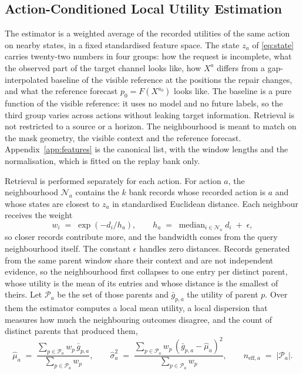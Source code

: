 \documentclass{article}
\newcommand{\calN}{\mathcal{N}}
\newcommand{\calP}{\mathcal{P}}
\begin{document}
\subsection{Action-Conditioned Local Utility Estimation}
\label{sec:method-scoring}
The estimator is a weighted average of the recorded utilities of the same action on nearby
states, in a fixed standardised feature space. The state $z_a$ of \eqref{eq:state} carries
twenty-two numbers in four groups: how the request is incomplete, what the observed part of the
target channel looks like, how $X^{a}$ differs from a gap-interpolated baseline of the visible
reference at the positions the repair changes, and what the reference forecast
$p_0 = F(X^{a_0})$ looks like. The baseline is a pure function of the visible reference: it
uses no model and no future labels, so the third group varies across actions without leaking
target information. Retrieval is not
restricted to a source or a horizon. The neighbourhood is meant to match on the mask geometry,
the visible context and the reference forecast. Appendix~\ref{app:features} is the canonical
list, with the window lengths and the normalisation, which is fitted on the replay bank only.

Retrieval is performed separately for each action. For action $a$, the neighbourhood
$\calN_a$ contains the $k$ bank records whose recorded action is $a$ and whose states are
closest to $z_a$ in standardised Euclidean distance. Each neighbour receives the weight
\begin{equation}
  w_i \;=\; \exp\!\left(-d_i / h_a\right),
  \qquad
  h_a \;=\; \operatorname{median}_{i \in \calN_a} d_i \;+\; \epsilon ,
  \label{eq:weights}
\end{equation}
so closer records contribute more, and the bandwidth comes from the query neighbourhood
itself. The constant $\epsilon$ handles zero distances. Records generated from the same
parent window share their context and are not independent evidence, so the neighbourhood
first collapses to one entry per distinct parent, whose utility is the mean of its entries and
whose distance is the smallest of theirs. Let $\calP_a$ be the set of those parents and
$\bar g_{p,a}$ the utility of parent $p$. Over them the estimator computes a local mean
utility, a local dispersion that measures how much the neighbouring outcomes disagree, and the
count of distinct parents that produced them,
\begin{equation}
  \hat\mu_a \;=\; \frac{\sum_{p \in \calP_a} w_p\, \bar g_{p,a}}{\sum_{p \in \calP_a} w_p},
  \qquad
  \hat\sigma_a^{2} \;=\; \frac{\sum_{p \in \calP_a} w_p\, (\bar g_{p,a} - \hat\mu_a)^{2}}{\sum_{p \in \calP_a} w_p},
  \qquad
  n_{\mathrm{eff},a} \;=\; \left| \calP_a \right| .
  \label{eq:local-moments}
\end{equation}
\end{document}
